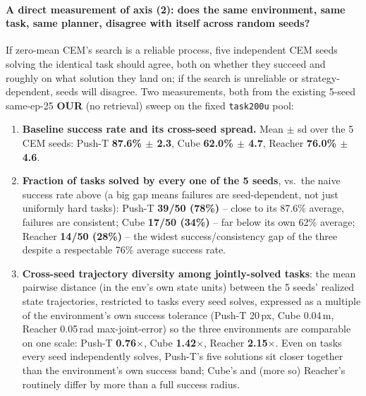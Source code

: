 \documentclass[11pt]{article}
\begin{document}
\paragraph{A direct measurement of axis (2): does the same environment, same task, same
planner, disagree with itself across random seeds?} If zero-mean CEM's search is a reliable
process, five independent CEM seeds solving the identical task should agree, both on whether
they succeed and roughly on what solution they land on; if the search is unreliable or
strategy-dependent, seeds will disagree. Two measurements, both from the existing 5-seed
same-ep-25 \textbf{OUR} (no retrieval) sweep on the fixed \texttt{task200u} pool:
\begin{enumerate}[nosep]
  \item \textbf{Baseline success rate and its cross-seed spread.} Mean $\pm$ sd over the 5
  CEM seeds: Push-T \textbf{87.6\% $\pm$ 2.3}, Cube \textbf{62.0\% $\pm$ 4.7}, Reacher
  \textbf{76.0\% $\pm$ 4.6}.
  \item \textbf{Fraction of tasks solved by every one of the 5 seeds}, vs.\ the naive
  success rate above (a big gap means failures are seed-dependent, not just uniformly hard
  tasks): Push-T \textbf{39/50 (78\%)} -- close to its 87.6\% average, failures are
  consistent; Cube \textbf{17/50 (34\%)} -- far below its own 62\% average; Reacher
  \textbf{14/50 (28\%)} -- the widest success/consistency gap of the three despite a
  respectable 76\% average success rate.
  \item \textbf{Cross-seed trajectory diversity among jointly-solved tasks}: the mean
  pairwise distance (in the env's own state units) between the 5 seeds' realized state
  trajectories, restricted to tasks every seed solves, expressed as a multiple of the
  environment's own success tolerance (Push-T 20\,px, Cube 0.04\,m, Reacher 0.05\,rad
  max-joint-error) so the three environments are comparable on one scale: Push-T
  \textbf{0.76$\times$}, Cube \textbf{1.42$\times$}, Reacher \textbf{2.15$\times$}. Even on
  tasks every seed independently solves, Push-T's five solutions sit closer together than
  the environment's own success band; Cube's and (more so) Reacher's routinely differ by
  more than a full success radius.
\end{enumerate}
\end{document}
